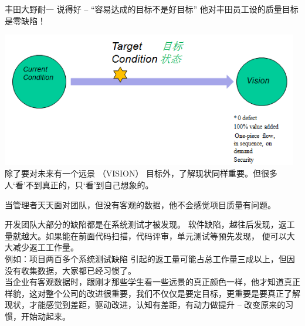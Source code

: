 丰田大野耐一 说得好 -- ``容易达成的目标不是好目标''
他对丰田员工设的质量目标是零缺陷！

\includegraphics[width=13cm]{mubiaozhungt.jpg}\\
除了要对未来有一个远景 （VISION）
目标外，了解现状同样重要。但很多人`看'不到真正的，只`看'到自己想象的。


当管理者天天面对团队，但没有客观的数据，他不会感觉项目质量有问题。

开发团队大部分的缺陷都是在系统测试才被发现。
软件缺陷，越往后发现，返工量就越大。如果能在前面代码扫描，代码评审，单元测试等预先发现，
便可以大大减少返工工作量。\\
例如：项目两百多个系统测试缺陷
引起的返工量可能占总工作量三成以上，但因没有收集数据，大家都已经习惯了。\\
当企业有客观数据时，跟刚才那些学生看一些远景的真正颜色一样，他才知道真正样貌，这对整个公司的改进很重要，我们不仅仅是要定目标，更重要是要真正了解现状，才能感觉到差距，驱动改进，认知有差距，有动力做提升
-- 改变原来的习惯，开始动起来。

